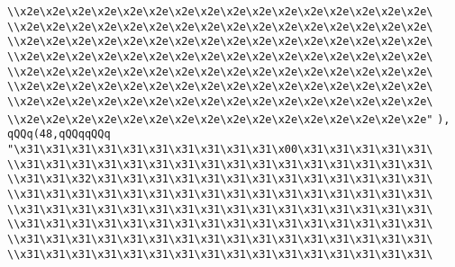 \verb|\\x2e\x2e\x2e\x2e\x2e\x2e\x2e\x2e\x2e\x2e\x2e\x2e\x2e\x2e\x2e\x2e\|\newline
\verb|\\x2e\x2e\x2e\x2e\x2e\x2e\x2e\x2e\x2e\x2e\x2e\x2e\x2e\x2e\x2e\x2e\|\newline
\verb|\\x2e\x2e\x2e\x2e\x2e\x2e\x2e\x2e\x2e\x2e\x2e\x2e\x2e\x2e\x2e\x2e\|\newline
\verb|\\x2e\x2e\x2e\x2e\x2e\x2e\x2e\x2e\x2e\x2e\x2e\x2e\x2e\x2e\x2e\x2e\|\newline
\verb|\\x2e\x2e\x2e\x2e\x2e\x2e\x2e\x2e\x2e\x2e\x2e\x2e\x2e\x2e\x2e\x2e\|\newline
\verb|\\x2e\x2e\x2e\x2e\x2e\x2e\x2e\x2e\x2e\x2e\x2e\x2e\x2e\x2e\x2e\x2e\|\newline
\verb|\\x2e\x2e\x2e\x2e\x2e\x2e\x2e\x2e\x2e\x2e\x2e\x2e\x2e\x2e\x2e\x2e\|\newline
\verb|\\x2e\x2e\x2e\x2e\x2e\x2e\x2e\x2e\x2e\x2e\x2e\x2e\x2e\x2e\x2e\x2e"|\newline
\verb|),|\newline
\verb|qQQq(48,qQQqqQQq|\newline
\verb|"\x31\x31\x31\x31\x31\x31\x31\x31\x31\x31\x00\x31\x31\x31\x31\x31\|\newline
\verb|\\x31\x31\x31\x31\x31\x31\x31\x31\x31\x31\x31\x31\x31\x31\x31\x31\|\newline
\verb|\\x31\x31\x32\x31\x31\x31\x31\x31\x31\x31\x31\x31\x31\x31\x31\x31\|\newline
\verb|\\x31\x31\x31\x31\x31\x31\x31\x31\x31\x31\x31\x31\x31\x31\x31\x31\|\newline
\verb|\\x31\x31\x31\x31\x31\x31\x31\x31\x31\x31\x31\x31\x31\x31\x31\x31\|\newline
\verb|\\x31\x31\x31\x31\x31\x31\x31\x31\x31\x31\x31\x31\x31\x31\x31\x31\|\newline
\verb|\\x31\x31\x31\x31\x31\x31\x31\x31\x31\x31\x31\x31\x31\x31\x31\x31\|\newline
\verb|\\x31\x31\x31\x31\x31\x31\x31\x31\x31\x31\x31\x31\x31\x31\x31\x31\|\newline
